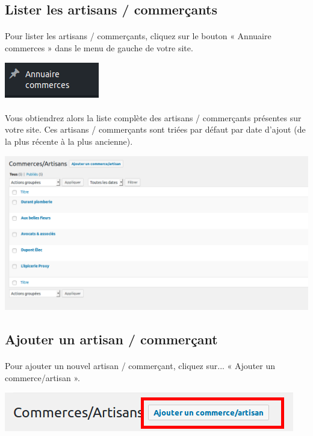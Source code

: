 \documentclass[10pt,a4paper]{article}
\begin{document}
\subsection{Lister les artisans / commerçants}
\paragraph{}Pour lister les artisans / commerçants, cliquez sur le bouton « Annuaire commerces » dans le menu de gauche de votre site.
\begin{center}
\includegraphics[scale=0.3]{img/0306.png}
\end{center}
\paragraph{}Vous obtiendrez alors la liste complète des artisans / commerçants présentes sur votre site. Ces artisans / commerçants sont triées par défaut par date d'ajout (de la plus récente à la plus ancienne).
\begin{center}
\includegraphics[scale=0.2]{img/0307.png}
\end{center}
\subsection{Ajouter un artisan / commerçant}
\paragraph{}Pour ajouter un nouvel artisan / commerçant, cliquez sur... « Ajouter un commerce/artisan ».
\begin{center}
\includegraphics[scale=0.3]{img/0308.png}
\end{center}
\end{document}

